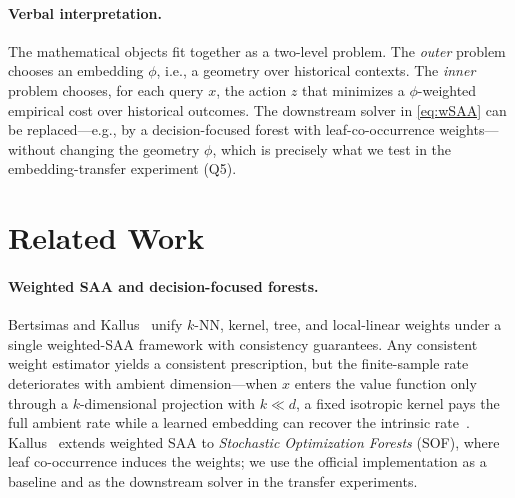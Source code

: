 \documentclass[11pt]{article}
\begin{document}
\paragraph{Verbal interpretation.}
The mathematical objects fit together as a two-level problem. The \emph{outer} problem chooses an embedding $\phi$, i.e., a geometry over historical contexts. The \emph{inner} problem chooses, for each query $x$, the action $z$ that minimizes a $\phi$-weighted empirical cost over historical outcomes. The downstream solver in \eqref{eq:wSAA} can be replaced---e.g., by a decision-focused forest with leaf-co-occurrence weights---without changing the geometry $\phi$, which is precisely what we test in the embedding-transfer experiment (Q5).

\section{Related Work}\label{sec:related}

\paragraph{Weighted SAA and decision-focused forests.}
Bertsimas and Kallus~\cite{bertsimas2020predictive} unify $k$-NN, kernel, tree, and local-linear weights under a single weighted-SAA framework with consistency guarantees. Any consistent weight estimator yields a consistent prescription, but the finite-sample rate deteriorates with ambient dimension---when $x$ enters the value function only through a $k$-dimensional projection with $k\ll d$, a fixed isotropic kernel pays the full ambient rate while a learned embedding can recover the intrinsic rate~\cite{stone1982optimal}. Kallus~\cite{kallus2023sof} extends weighted SAA to \emph{Stochastic Optimization Forests} (SOF), where leaf co-occurrence induces the weights; we use the official implementation as a baseline and as the downstream solver in the transfer experiments.
\end{document}
